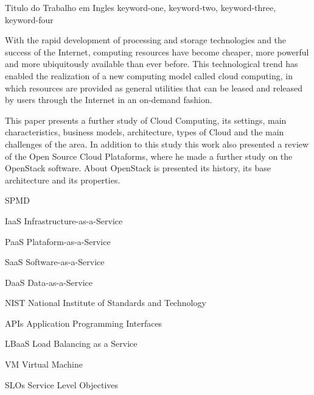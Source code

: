 \documentclass[ti]{texufpel}
\begin{document}
\begin{englishabstract}%
  {Titulo do Trabalho em Ingles}%
  {keyword-one, keyword-two, keyword-three, keyword-four}
  
With the rapid development of processing and storage technologies and the success of the Internet, computing resources have become cheaper, more powerful and more ubiquitously available than ever before. This technological trend has enabled the realization of a new computing model called cloud computing, in which resources are provided as general utilities that can be leased and released by users through the Internet in an on-demand fashion.

This paper presents a further study of Cloud Computing, its settings, main characteristics, business models, architecture, types of Cloud and the main challenges of the area. In addition to this study this work also presented a review of the Open Source Cloud Plataforms, where he made a further study on the OpenStack software. About OpenStack is presented its history, its base architecture and its properties.

  
\end{englishabstract}

\listoffigures

\listoftables

\begin{listofabbrv}{SPMD}
        \item[IaaS] Infrastructure-as-a-Service
        \item[PaaS] Plataform-as-a-Service
        \item[SaaS] Software-as-a-Service
        \item[DaaS] Data-as-a-Service
        \item[NIST] National Institute of Standards and Technology
        \item[APIs] Application Programming Interfaces
        \item[LBaaS] Load Balancing as a Service
        \item[VM] Virtual Machine
        \item[SLOs] Service Level Objectives
\end{listofabbrv}

\tableofcontents

 








\annex 
\end{document}
